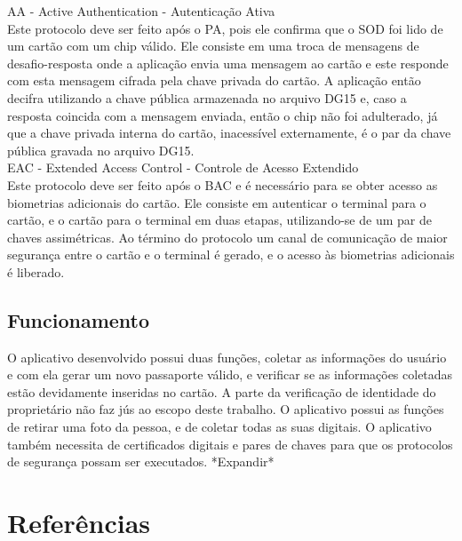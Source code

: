 \documentclass{article}
\begin{document}
\begin{justify}
			\hspace*{2cm} AA - Active Authentication - Autenticação Ativa\\
			\hspace*{2cm} Este protocolo deve ser feito após o PA, pois ele confirma que o SOD foi lido de um cartão com um chip válido. Ele consiste em uma troca de mensagens de desafio-resposta onde a aplicação envia uma mensagem ao cartão e este responde com esta mensagem cifrada pela chave privada do cartão. A aplicação então decifra utilizando a chave pública armazenada no arquivo DG15 e, caso a resposta coincida com a mensagem enviada, então o chip não foi adulterado, já que a chave privada interna do cartão, inacessível externamente, é o par da chave pública gravada no arquivo DG15.\\
			
			\hspace*{2cm} EAC - Extended Access Control - Controle de Acesso Extendido\\
			\hspace*{2cm} Este protocolo deve ser feito após o BAC e é necessário para se obter acesso as biometrias adicionais do cartão. Ele consiste em autenticar o terminal para o cartão, e o cartão para o terminal em duas etapas, utilizando-se de um par de chaves assimétricas. Ao término do protocolo um canal de comunicação de maior segurança entre o cartão e o terminal é gerado, e o acesso às biometrias adicionais é liberado.
			
		\end{justify}

	\subsection{Funcionamento}
		\begin{justify}
			\hspace{2cm} O aplicativo desenvolvido possui duas funções, coletar as informações do usuário e com ela gerar um novo passaporte válido, e verificar se as informações coletadas estão devidamente inseridas no cartão. A parte da verificação de identidade do proprietário não faz jús ao escopo deste trabalho. O aplicativo possui as funções de retirar uma foto da pessoa, e de coletar todas as suas digitais. O aplicativo também necessita de certificados digitais e pares de chaves para que os protocolos de segurança possam ser executados.
			\hspace*{2cm} *Expandir*
			
		\end{justify}

	\section{}
		\begin{justify}
			
			
		\end{justify}

\begingroup
	\section{Referências}
		\renewcommand{\section}[2]{}
		
		
		
		
\endgroup
\end{document}
